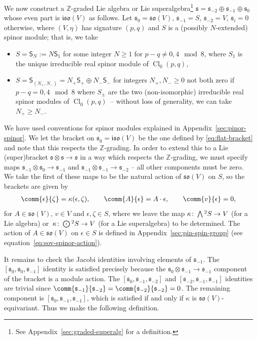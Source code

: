 \documentclass[pdftex]{sigma}
\numberwithin{equation}{section}
\newcommand{\fs}{\mathfrak{s}}
\newcommand{\fso}{\mathfrak{so}}
\newcommand{\fiso}{\mathfrak{iso}}
\newcommand{\ZZ}{\mathbb{Z}}
\newcommand{\ssS}{\mathsf{S}}
\newcommand{\Wedge}{\mathchoice{{\textstyle\bigwedge}}{\bigwedge}{\bigwedge}{\bigwedge}}	%
\newcommand{\Odot}{\mathchoice{{\textstyle\bigodot}}{\bigodot}{\bigodot}{\bigodot}}
\newcommand{\1}{\mathbbm{1}}
\DeclareMathOperator{\Cl}{Cl}
\begin{document}
We now construct a $\ZZ$-graded Lie algebra or Lie superalgebra\footnote{See Appendix~\ref{sec:graded-superalg} for a definition.} $\fs=\fs_{-2}\oplus\fs_{-1}\oplus\fs_{0}$ whose even part is $\fiso(V)$ as follows. Let
$\fs_0 = \fso(V)$, $
 \fs_{-1} = S$, $
 \fs_{-2} = V$, $
 \fs_i = 0$ otherwise,
where $(V,\eta)$ has signature $(p,q)$ and $S$ is a (possibly $N$-extended) spinor module; that is, we take
\begin{itemize}\itemsep=0pt
	\item $S = \ssS_N := N\ssS_1$ for some integer $N\geq 1$ for $p-q\neq 0,4\mod 8$, where $S_1$ is the unique irreducible real spinor module of $\Cl_{\overline 0}(p,q)$,
	\item $S = \ssS_{(N_+,N_-)} = N_+\ssS_+\oplus N_-\ssS_-$ for integers $N_+, N_-\geq 0$ not both zero if $p-q= 0,4\mod 8$ where $S_\pm$ are the two (non-isomorphic) irreducible real spinor modules of $\Cl_{\overline 0}(p,q)$~-- without loss of generality, we can take $N_+\geq N_-$.
\end{itemize}
We have used conventions for spinor modules explained in Appendix~\ref{sec:pinor-spinor}. We let the bracket on $\fs_{\overline 0}=\fiso(V)$ be the one defined by \eqref{eq:flat-bracket} and note that this respects the $\ZZ$-grading. In order to extend this to a Lie (super)bracket $\fs\otimes\fs\to\fs$ in a way which respects the $\ZZ$-grading, we must specify maps $\fs_{-1}\otimes\fs_0\to\fs_{-1}$ and $\fs_{-1}\otimes\fs_{-1}\to\fs_{-2}$ -- all other components must be zero. We take the first of these maps to be the natural action of $\fso(V)$ on $S$, so the brackets are given by
\begin{align}\label{eq:flat-spinor-bracket}
 \comm{\epsilon}{\zeta} = \kappa(\epsilon,\zeta),\qquad
 \comm{A}{\epsilon} = A\cdot\epsilon,\qquad
 \comm{v}{\epsilon} = 0,
\end{align}
for $A\in\fso(V)$, $v\in V$ and $\epsilon,\zeta\in S$, where we leave the map $\kappa\colon \Wedge^2 S\to V$ (for a Lie algebra) or~${\kappa\colon \Odot^2 S\to V}$ (for a Lie superalgebra) to be determined. The action of $A\in\fso(V)$ on $\epsilon\in S$ is defined in Appendix~\ref{sec:pin-spin-group} (see equation~\eqref{eq:sov-spinor-action}).

It remains to check the Jacobi identities involving elements of $\fs_{-1}$. The $[\fs_0,\fs_0,\fs_{-1}]$ identity is satisfied precisely because the $\fs_0\otimes\fs_{-1}\to\fs_{-1}$ component of the bracket is a module action. The $[\fs_0,\fs_{-1},\fs_{-2}]$ and $[\fs_{-2},\fs_{-1},\fs_{-1}]$ identities are trivial since $\comm{\fs_{-1}}{\fs_{-2}}=\comm{\fs_{-2}}{\fs_{-2}}=0$. The remaining component is $[\fs_0,\fs_{-1},\fs_{-1}]$, which is satisfied if and only if $\kappa$ is $\fso(V)$-equivariant. Thus we make the following definition.
\end{document}

